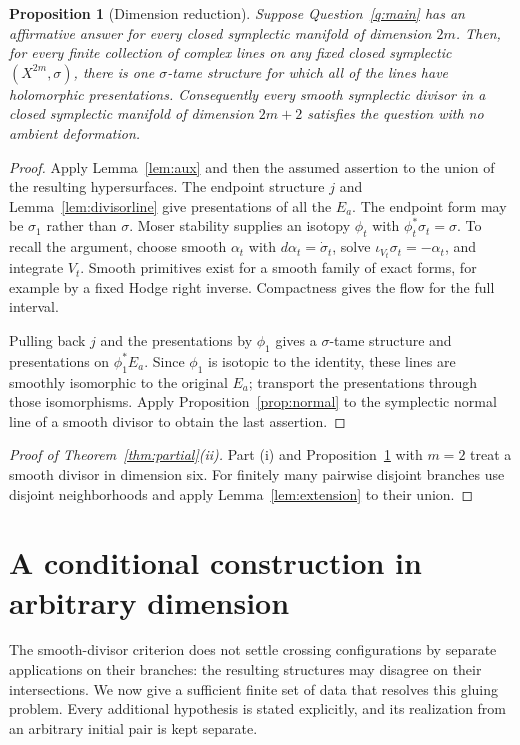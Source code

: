 \documentclass[11pt]{article}
\newtheorem{proposition}[theorem]{Proposition}
\theoremstyle{definition}
\theoremstyle{remark}
\begin{document}
\begin{proposition}[Dimension reduction]\label{prop:reduction}
Suppose Question~\ref{q:main} has an affirmative answer for every closed symplectic manifold of dimension $2m$. Then, for every finite collection of complex lines on any fixed closed symplectic $(X^{2m},\sigma)$, there is one $\sigma$-tame structure for which all of the lines have holomorphic presentations. Consequently every smooth symplectic divisor in a closed symplectic manifold of dimension $2m+2$ satisfies the question with no ambient deformation.
\end{proposition}
\begin{proof}
Apply Lemma~\ref{lem:aux} and then the assumed assertion to the union of the resulting hypersurfaces. The endpoint structure $j$ and Lemma~\ref{lem:divisorline} give presentations of all the $E_a$. The endpoint form may be $\sigma_1$ rather than $\sigma$. Moser stability supplies an isotopy $\phi_t$ with $\phi_t^*\sigma_t=\sigma$. To recall the argument, choose smooth $\alpha_t$ with $d\alpha_t=\dot\sigma_t$, solve $\iota_{V_t}\sigma_t=-\alpha_t$, and integrate $V_t$. Smooth primitives exist for a smooth family of exact forms, for example by a fixed Hodge right inverse. Compactness gives the flow for the full interval.

Pulling back $j$ and the presentations by $\phi_1$ gives a $\sigma$-tame structure and presentations on $\phi_1^*E_a$. Since $\phi_1$ is isotopic to the identity, these lines are smoothly isomorphic to the original $E_a$; transport the presentations through those isomorphisms. Apply Proposition~\ref{prop:normal} to the symplectic normal line of a smooth divisor to obtain the last assertion.
\end{proof}

\begin{proof}[Proof of Theorem~\ref{thm:partial}(ii)]
Part (i) and Proposition~\ref{prop:reduction} with $m=2$ treat a smooth divisor in dimension six. For finitely many pairwise disjoint branches use disjoint neighborhoods and apply Lemma~\ref{lem:extension} to their union.
\end{proof}

\section{A conditional construction in arbitrary dimension}\label{sec:conditional}

The smooth-divisor criterion does not settle crossing configurations by separate applications on their branches: the resulting structures may disagree on their intersections. We now give a sufficient finite set of data that resolves this gluing problem. Every additional hypothesis is stated explicitly, and its realization from an arbitrary initial pair is kept separate.
\end{document}
